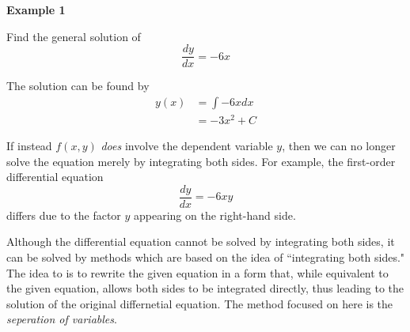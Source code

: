 \documentclass{article}
\begin{document}
\textbf{Example 1}

Find the general solution of
$$ \frac{dy}{dx} = -6x $$

The solution can be found by
\begin{align}
    y(x) & = \int -6xdx \\
         & = -3x^2 + C
\end{align}

\hr

If instead $ f(x,y) $ \textit{does} involve the dependent variable $ y $, then we can no longer solve the equation merely by integrating both sides. For example, the first-order differential equation
\begin{equation}
    \frac{dy}{dx} = -6xy
\end{equation}
differs due to the factor $ y $ appearing on the right-hand side.

Although the differential equation cannot be solved by integrating both sides, it can be solved by methods which are based on the idea of ``integrating both sides." The idea to is to rewrite the given equation in a form that, while equivalent to the given equation, allows both sides to be integrated directly, thus leading to the solution of the original differnetial equation. The method focused on here is the \textit{seperation of variables}.
\end{document}
